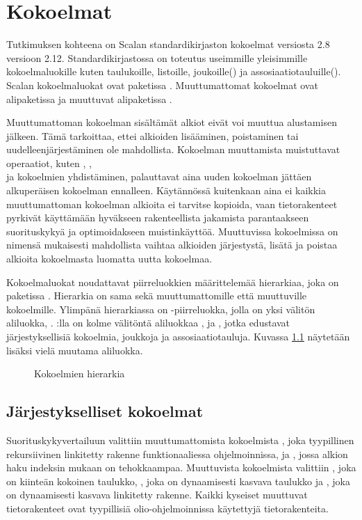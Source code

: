 \chapter{Kokoelmat} \label{Kokoelmat}
Tutkimuksen kohteena on Scalan standardikirjaston kokoelmat versiosta 2.8 versioon 2.12. Standardikirjastossa on toteutus useimmille yleisimmille kokoelmaluokille kuten taulukoille, listoille, joukoille() ja assosiaatiotauluille(). Scalan kokoelmaluokat ovat paketissa . Muuttumattomat kokoelmat ovat alipaketissa  ja muuttuvat alipaketissa .
\cite{scalaCollections}

Muuttumattoman kokoelman sisältämät alkiot eivät voi muuttua alustamisen jälkeen. Tämä tarkoittaa, ettei alkioiden lisääminen, poistaminen tai uudelleenjärjestäminen ole mahdollista. Kokoelman muuttamista muistuttavat operaatiot, kuten , , \\ ja kokoelmien yhdistäminen, palauttavat aina uuden kokoelman jättäen alkuperäisen kokoelman ennalleen. Käytännössä kuitenkaan aina ei kaikkia muuttumattoman kokoelman alkioita ei tarvitse kopioida, vaan tietorakenteet pyrkivät käyttämään hyväkseen rakenteellista jakamista parantaakseen suorituskykyä ja optimoidakseen muistinkäyttöä. Muuttuvissa kokoelmissa on nimensä mukaisesti mahdollista vaihtaa alkioiden järjestystä, lisätä ja poistaa alkioita kokoelmasta luomatta uutta kokoelmaa.
\cite{scalaCollections}
\cite[Luku 22]{prorgrammingInScala3rd}

Kokoelmaluokat noudattavat piirreluokkien määrittelemää hierarkiaa, joka on paketissa . Hierarkia on sama sekä muuttumattomille että muuttuville kokoelmille. Ylimpänä hierarkiassa on -piirreluokka, jolla on yksi välitön aliluokka, . :lla on kolme välitöntä aliluokkaa ,  ja , jotka edustavat järjestyksellisiä kokoelmia, joukkoja ja assosiaatiotauluja. Kuvassa \ref{kokoelmahierarkia} näytetään lisäksi vielä muutama aliluokka.
\cite{scalaCollections}
\begin{figure}[h]
    \centering
    \caption{Kokoelmien hierarkia}\label{kokoelmahierarkia}
\end{figure}


\section{Järjestykselliset kokoelmat}
Suorituskykyvertailuun valittiin muuttumattomista kokoelmista , joka tyypillinen rekursiivinen linkitetty rakenne funktionaaliessa ohjelmoinnissa, ja , jossa alkion haku indeksin mukaan on tehokkaampaa. Muuttuvista kokoelmista valittiin , joka on kiinteän kokoinen taulukko, , joka on dynaamisesti kasvava taulukko ja , joka on dynaamisesti kasvava linkitetty rakenne. Kaikki kyseiset muuttuvat tietorakenteet ovat tyypillisiä olio-ohjelmoinnissa käytettyjä tietorakenteita.

